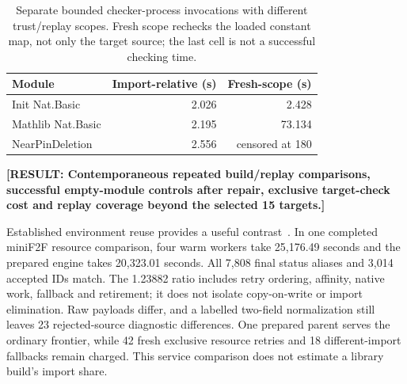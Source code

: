 \documentclass[10pt,twocolumn]{article}
\newcommand{\missing}[1]{\textbf{[RESULT: #1]}}
\begin{document}
\begin{table}[t]
\centering\small
\begin{tabular}{@{}lrr@{}}
\toprule
Module & Import-relative (s) & Fresh-scope (s)\\
\midrule
Init Nat.Basic & 2.026 & 2.428\\
Mathlib Nat.Basic & 2.195 & 73.134\\
NearPinDeletion & 2.556 & censored at 180\\
\bottomrule
\end{tabular}
\caption{Separate bounded checker-process invocations with different
trust/replay scopes. Fresh scope rechecks the loaded constant map, not
only the target source; the last cell is not a successful checking time.}
\label{tab:replay-scope}
\end{table}

\missing{Contemporaneous repeated build/replay comparisons, successful
empty-module controls after repair, exclusive target-check cost and
replay coverage beyond the selected 15 targets.}

Established environment reuse provides a useful contrast~\cite{repl,kimina}.
In one completed miniF2F resource comparison, four warm workers take
25,176.49 seconds and the prepared engine takes 20,323.01 seconds.
All 7,808 final status aliases and 3,014 accepted IDs match.
The 1.23882 ratio includes retry ordering, affinity, native work, fallback
and retirement; it does not isolate copy-on-write or import elimination.
Raw payloads differ, and a labelled two-field normalization still leaves
23 rejected-source diagnostic differences.
One prepared parent serves the ordinary frontier, while 42 fresh exclusive
resource retries and 18 different-import fallbacks remain charged.
This service comparison does not estimate a library build's import share.
\end{document}
